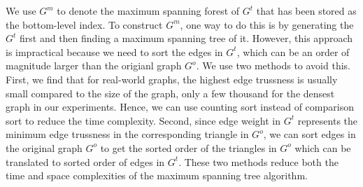 We use $G^m$ to denote the maximum spanning forest of $G^t$ that has been stored as the bottom-level index. To construct $G^m$, one way to do this is by generating the \inducedgraph{} $G^t$ first and then finding a maximum spanning tree of it. However, this approach is impractical because we need to sort the edges in $G^t$, which can be an order of magnitude larger than the origianl graph $G^o$. We use two methods to avoid this. First, we find that for real-world graphs, the highest edge trussness is usually small compared to the size of the graph, \eg only a few thousand for the densest graph in our experiments. Hence, we can use counting sort instead of comparison sort to reduce the time complexity. Second, since edge weight in $G^t$ represents the minimum edge trussness in the corresponding triangle in $G^o$, we can sort edges in the original graph $G^o$ to get the sorted order of the triangles in $G^o$ which can be translated to sorted order of edges in $G^t$. These two methods reduce both the time and space complexities of the maximum spanning tree algorithm.


